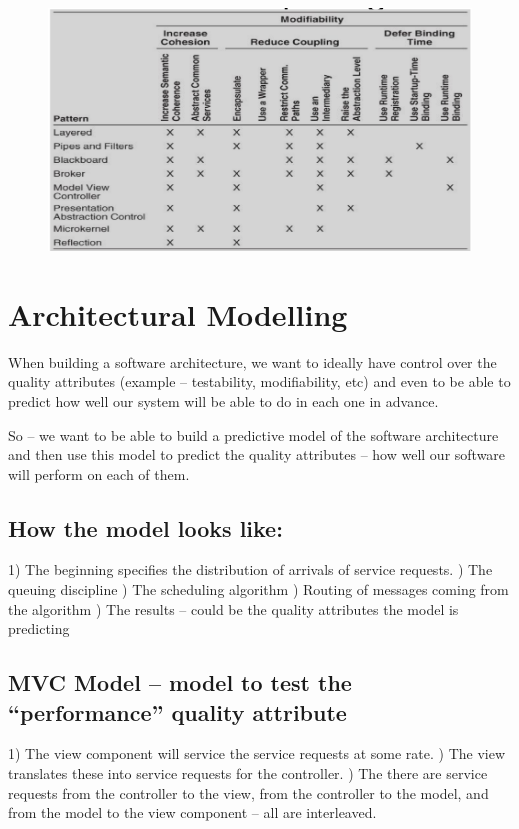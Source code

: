 \documentclass[a4paper]{article}
\begin{document}
\begin{figure}[H]
\centering
  \includegraphics[width=1\linewidth]
  {images/relationship.png}
\end{figure}

\newpage
\section{Architectural Modelling}
When building a software architecture, we want to ideally have control over the quality attributes (example – testability, modifiability, etc) and even to be able to predict how well our system will be able to do in each one in advance. 

So – we want to be able to build a predictive model of the software architecture and then use this model to predict the quality attributes – how well our software will perform on each of them.

\subsection{How the model looks like:}
1)  The beginning specifies the distribution of arrivals of service requests. )  The queuing discipline )  The scheduling algorithm  )  Routing of messages coming from the algorithm  )  The results – could be the quality attributes the model is predicting \newline

\subsection{MVC Model – model to test the “performance” quality attribute}
1) The view component will service the service requests at some rate.  ) The view translates these into service requests for the controller.  ) The there are service requests from the controller to the view, from the controller to the model, and from the model to the view component – all are interleaved.  \newline
\end{document}
